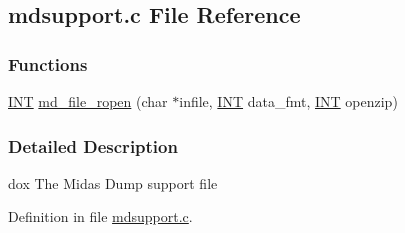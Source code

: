 \subsection{mdsupport.c File Reference}
\label{mdsupport_8c}
\subsubsection*{Functions}
\begin{DoxyCompactItemize}
\item 
\hyperlink{vppg_8h_a392e62da233ed3e2f7c3fd4f487a3896}{INT} \hyperlink{group__mdsupportincludecode_ga133a44577a83b8b79a5fe481b3664101}{md\_\-file\_\-ropen} (char $\ast$infile, \hyperlink{vppg_8h_a392e62da233ed3e2f7c3fd4f487a3896}{INT} data\_\-fmt, \hyperlink{vppg_8h_a392e62da233ed3e2f7c3fd4f487a3896}{INT} openzip)
\end{DoxyCompactItemize}


\subsubsection{Detailed Description}
dox The Midas Dump support file 

Definition in file \hyperlink{mdsupport_8c_source}{mdsupport.c}.